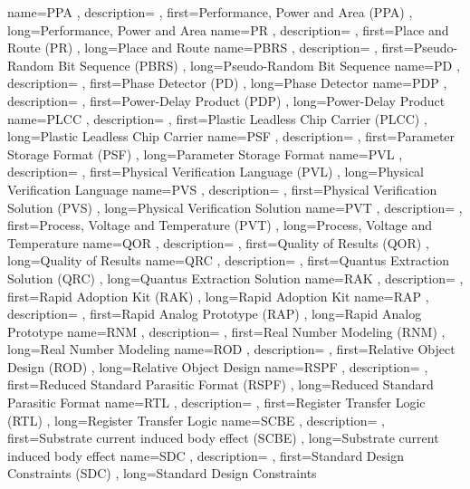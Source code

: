 { name={PPA}
, description={}
, first={Performance, Power and Area (PPA)}
, long={Performance, Power and Area}
}
{ name={PR}
, description={}
, first={Place and Route (PR)}
, long={Place and Route}
}
{ name={PBRS}
, description={}
, first={Pseudo-Random Bit Sequence (PBRS)}
, long={Pseudo-Random Bit Sequence}
}
{ name={PD}
, description={}
, first={Phase Detector (PD)}
, long={Phase Detector}
}
{ name={PDP}
, description={}
, first={Power-Delay Product (PDP)}
, long={Power-Delay Product}
}
{ name={PLCC}
, description={}
, first={Plastic Leadless Chip Carrier (PLCC)}
, long={Plastic Leadless Chip Carrier}
}
{ name={PSF}
, description={}
, first={Parameter Storage Format (PSF)}
, long={Parameter Storage Format}
}
{ name={PVL}
, description={}
, first={Physical Verification Language (PVL)}
, long={Physical Verification Language}
}
{ name={PVS}
, description={}
, first={Physical Verification Solution (PVS)}
, long={Physical Verification Solution}
}
{ name={PVT}
, description={}
, first={Process, Voltage and Temperature (PVT)}
, long={Process, Voltage and Temperature}
}
{ name={QOR}
, description={}
, first={Quality of Results (QOR)}
, long={Quality of Results}
}
{ name={QRC}
, description={}
, first={Quantus Extraction Solution (QRC)}
, long={Quantus Extraction Solution}
}
{ name={RAK}
, description={}
, first={Rapid Adoption Kit (RAK)}
, long={Rapid Adoption Kit}
}
{ name={RAP}
, description={}
, first={Rapid Analog Prototype (RAP)}
, long={Rapid Analog Prototype}
}
{ name={RNM}
, description={}
, first={Real Number Modeling (RNM)}
, long={Real Number Modeling}
}
{ name={ROD}
, description={}
, first={Relative Object Design (ROD)}
, long={Relative Object Design}
}
{ name={RSPF}
, description={}
, first={Reduced Standard Parasitic Format (RSPF)}
, long={Reduced Standard Parasitic Format}
}
{ name={RTL}
, description={}
, first={Register Transfer Logic (RTL)}
, long={Register Transfer Logic}
}
{ name={SCBE}
, description={}
, first={Substrate current induced body effect (SCBE)}
, long={Substrate current induced body effect}
}
{ name={SDC}
, description={}
, first={Standard Design Constraints (SDC)}
, long={Standard Design Constraints}
}
